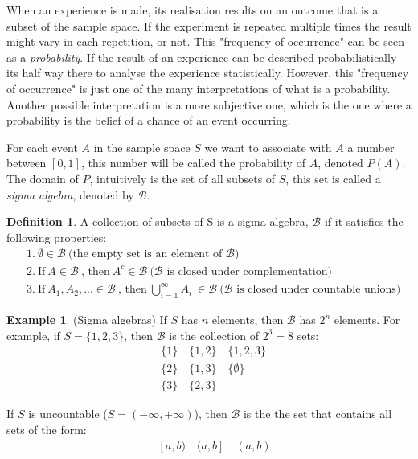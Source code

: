 \documentclass[
  oneside,
  11pt, a4paper,
  footinclude=true,
  headinclude=true,
  cleardoublepage=empty
]{scrbook}
\theoremstyle{definition}
\newtheorem{definition}{Definition}[section]
\theoremstyle{definition}
\newtheorem{example}{Example}[definition]
\begin{document}
                When an experience is made, its realisation results on an outcome that is a subset of the sample space. If the experiment is repeated multiple times the result might vary in each repetition, or not. This "frequency of occurrence" can be seen as a \emph{probability}. If the result of an experience can be described probabilistically its half way there to analyse the experience statistically. However, this "frequency of occurrence" is just one of the many interpretations of what is a probability. Another possible interpretation is a more subjective one, which is the one where a probability is the belief of a chance of an event occurring.
                
                For each event $A$ in the sample space $S$ we want to associate with $A$ a number between $[0, 1]$, this number will be called the probability of $A$, denoted $P(A)$. The domain of $P$, intuitively is the set of all subsets of $S$, this set is called a \emph{sigma algebra}, denoted by $\mathscr{B}$.%
                
                \begin{definition}{A collection of subsets of S is a sigma algebra, $\mathscr{B}$ if it satisfies the following properties:}
                \begin{align*}
                    &1.\ \emptyset \in \mathscr{B}\ \text{(the empty set is an element of $\mathscr{B}$)}\\
                    &2.\ \text{If}\ A \in \mathscr{B}\ \text{, then}\ A^c \in \mathscr{B}\  \text{($\mathscr{B}$ is closed under complementation)}\\
                    &3.\ \text{If}\ A_1, A_2, ... \in \mathscr{B}\ \text{, then}\ \bigcup_{i=1}^{\infty} A_i \ \in \mathscr{B}\ \text{($\mathscr{B}$ is closed under countable unions)}
                \end{align*}{}
                \end{definition}{}
                
                \begin{example}{(Sigma algebras)}
                    If $S$ has $n$ elements, then $\mathscr{B}$ has $2^n$ elements. For example, if $S = \{1,2,3\}$, then $\mathscr{B}$ is the collection of $2^3 = 8$ sets:
                    \begin{align*}
                        &\{1\}\quad \{1,2\}\quad \{1,2,3\} \\
                        &\{2\}\quad \{1,3\}\quad \{\emptyset\} \\
                        &\{3\}\quad \{2,3\}
                    \end{align*}{}
                    
                    If $S$ is uncountable ($S = (-\infty, +\infty)$), then $\mathscr{B}$ is the the set that contains all sets of the form:
                    \begin{align*}
                       [a, b]\quad [a, b)\quad (a, b]\quad (a, b) 
                    \end{align*}{}
                \end{example}{}
                
\end{document}
